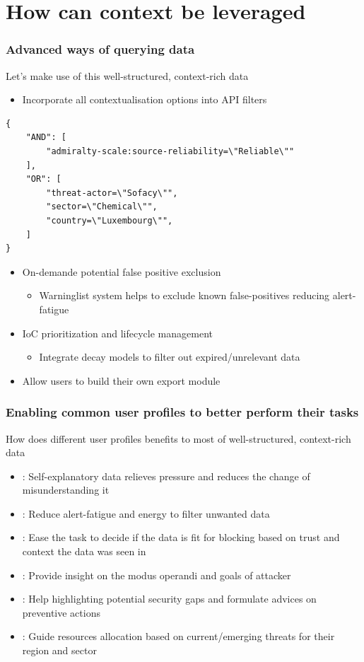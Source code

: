 \section{How can context be leveraged}
\begin{frame}[fragile]
    \frametitle{Advanced ways of querying data}
    Let's make use of this well-structured, context-rich data
    \begin{itemize}
        \item Incorporate all contextualisation options into API filters
    \end{itemize}
\begin{lstlisting}
{
    "AND": [
        "admiralty-scale:source-reliability=\"Reliable\""
    ],
    "OR": [
        "threat-actor=\"Sofacy\"",
        "sector=\"Chemical\"",
        "country=\"Luxembourg\"",
    ]
}
\end{lstlisting}

    \begin{itemize}
        \item On-demande potential false positive exclusion
        \begin{itemize}
            \item Warninglist system helps to exclude known false-positives reducing alert-fatigue
        \end{itemize}
        \item IoC prioritization and lifecycle management
        \begin{itemize}
            \item Integrate decay models to filter out expired/unrelevant data
        \end{itemize}
        \item Allow users to build their own export module
    \end{itemize}
\end{frame}

\begin{frame}
    \frametitle{Enabling common user profiles to better perform their tasks}
    How does different user profiles benefits to most of well-structured, context-rich data
    \begin{itemize}
        \item[\textbf{incident responder}]: Self-explanatory data relieves pressure and reduces the change of misunderstanding it
        \item[\textbf{SOC operator}]: Reduce alert-fatigue and energy to filter unwanted data
        \item[\textbf{ISP}]: Ease the task to decide if the data is fit for blocking based on trust and context the data was seen in
        \item[\textbf{threat analyst}]: Provide insight on the modus operandi and goals of attacker
        \item[\textbf{risk analyst}]: Help highlighting potential security gaps and formulate advices on preventive actions
        \item[\textbf{decision maker}]: Guide resources allocation based on current/emerging threats for their region and sector
    \end{itemize}
\end{frame}



